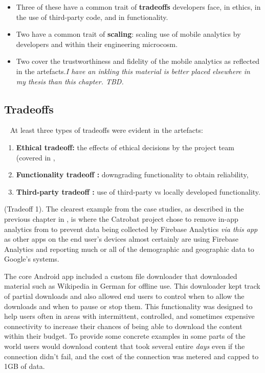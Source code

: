 \begin{itemize}
    \item Three of these have a common trait of \textbf{tradeoffs} developers face, in ethics, in the use of third-party code, and in functionality.
    \item Two have a common trait of \textbf{scaling}: scaling use of mobile analytics by developers and within their engineering microcosm.
    \item Two cover the trustworthiness and fidelity of the mobile analytics as reflected in the artefacts.\emph{I have an inkling this material is better placed elsewhere in my thesis than this chapter. TBD.} 
\end{itemize}

\subsection{Tradeoffs}~\label{aata-tradeoffs-topic}
At least three types of tradeoffs were evident in the artefacts: 
\begin{enumerate}
    \item \textbf{Ethical tradeoff: } the effects of ethical decisions by the project team (covered in ,
    \item \textbf{Functionality tradeoff :} downgrading functionality to obtain reliability,
    \item \textbf{Third-party tradeoff :} use of third-party vs locally developed functionality.
\end{enumerate}

 (Tradeoff 1).
The clearest example from the case studies, as described in the previous chapter in , is where the Catrobat project chose to remove in-app analytics from  to prevent data being collected by Firebase Analytics \emph{via this app} as other apps on the end user's devices almost certainly are using Firebase Analytics and reporting much or all of the demographic and geographic data to Google's systems.

The core  Android app included a custom file downloader that downloaded material such as Wikipedia in German for offline use. This downloader kept track of partial downloads and also allowed end users to control when to allow the downloads and when to pause or stop them. This functionality was designed to help users often in areas with intermittent, controlled, and sometimes expensive connectivity to increase their chances of being able to download the content within their budget. To provide some concrete examples in some parts of the world users would download content that took several entire \emph{days} even if the connection didn't fail, and the cost of the connection was metered and capped to 1GB of data.

